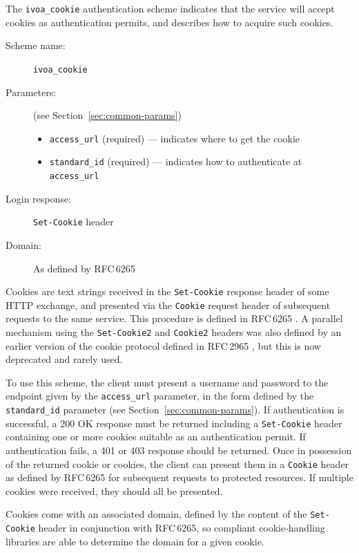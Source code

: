 \documentclass[11pt,a4paper]{ivoa}
\newcommand{\rfc}[1]{RFC\,#1}
\newcommand{\header}[1]{{\tt #1}}
\begin{document}
The \verb|ivoa_cookie| authentication scheme indicates that the service
will accept cookies as authentication permits,
and describes how to acquire such cookies.

\begin{description}
  \item[Scheme name:] \verb|ivoa_cookie|
  \item[Parameters:] (see Section~\ref{sec:common-params})
  \begin{itemize}
    \item \verb|access_url| (required) ---
          indicates where to get the cookie
    \item \verb|standard_id| (required) ---
          indicates how to authenticate at \verb|access_url|
  \end{itemize}
  \item[Login response:] \header{Set-Cookie} header
  \item[Domain:] As defined by \rfc{6265}
\end{description}

Cookies are text strings received in the {\tt Set-Cookie}
response header of some HTTP exchange,
and presented via the {\tt Cookie} request header of subsequent
requests to the same service.
This procedure is defined in \rfc{6265} \citep{std:RFC6265}.
A parallel mechanism using the {\tt Set-Cookie2} and {\tt Cookie2}
headers was also defined by an earlier version of the cookie protocol
defined in \rfc{2965} \citep{std:RFC2965},
but this is now deprecated and rarely used.

To use this scheme, the client must present a username and password
to the endpoint given by the \verb|access_url| parameter,
in the form defined by the \verb|standard_id| parameter
(see Section~\ref{sec:common-params}).
If authentication is successful, a 200 OK response must be returned
including a \header{Set-Cookie} header containing one or more cookies
suitable as an authentication permit.
If authentication fails, a 401 or 403 response should be returned.
Once in possession of the returned cookie or cookies,
the client can present them in a \header{Cookie} header as defined
by \rfc{6265} for subsequent requests to protected resources.
If multiple cookies were received, they should all be presented.

Cookies come with an associated domain, defined by the content
of the \header{Set-Cookie} header in conjunction with \rfc{6265},
so compliant cookie-handling
libraries are able to determine the domain for a given cookie.
\end{document}
